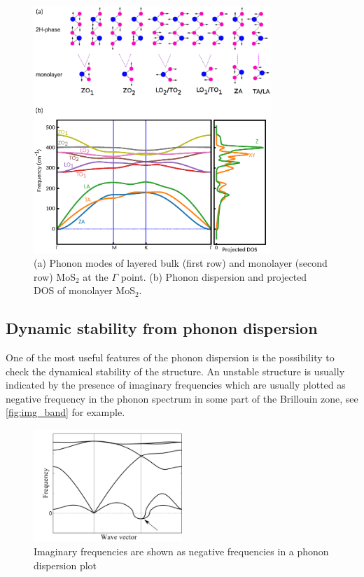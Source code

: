 \begin{figure}[htb] 
\centering  
\includegraphics[width=0.8\textwidth]{ph_mos2.eps}
\caption[The phonon modes at the $\Gamma$ point and the dispersion of MoS$_2$]{ (a) Phonon modes of layered bulk (first row) and monolayer (second row) MoS$_2$ at the $\Gamma$ point. (b) Phonon dispersion and projected DOS of monolayer MoS$_2$.}  
\label{fig:mos2_ph}
\end{figure} 


\subsection{Dynamic stability from phonon dispersion}

One of the most useful features of the phonon dispersion is the possibility to check the dynamical stability of the structure. An unstable structure is usually indicated by the presence of imaginary frequencies which are usually plotted as negative frequency in the phonon spectrum in some part of the Brillouin zone, see \autoref{fig:img_band} for example. 


\begin{figure}[htb] 
\centering  
\includegraphics[width=0.5\textwidth]{img_band.png}
\caption{Imaginary frequencies are shown as negative frequencies in a phonon dispersion plot}  
\label{fig:img_band}
\end{figure} 

